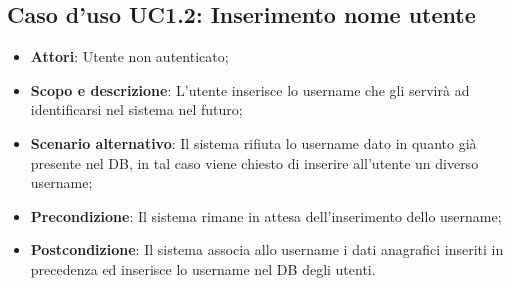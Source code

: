 \documentclass[12pt,a4paper,titlepage]{article}
\begin{document}
	\subsection{Caso d'uso UC1.2: Inserimento nome utente}
	\label{UC1.2}
	\begin{itemize}
		\item \textbf{Attori}: Utente non autenticato;
		\item \textbf{Scopo e descrizione}: L'utente inserisce lo username che gli servirà ad identificarsi nel sistema nel futuro;
		\item \textbf{Scenario alternativo}: Il sistema rifiuta lo username dato in quanto già presente nel DB, in tal caso viene chiesto di inserire all'utente un diverso username;
		\item \textbf{Precondizione}: Il sistema rimane in attesa dell'inserimento dello username;
		\item \textbf{Postcondizione}: Il sistema associa allo username i dati anagrafici inseriti in precedenza ed inserisce lo username nel DB degli utenti.
	\end{itemize}
\end{document}
